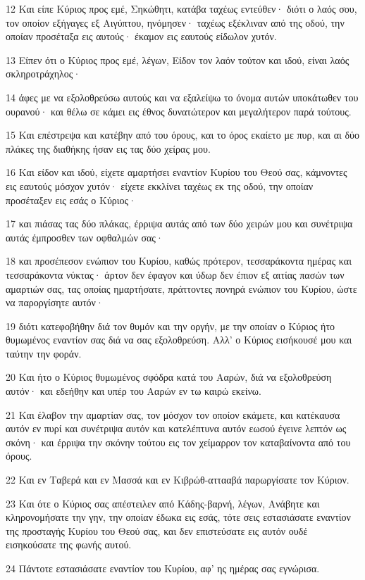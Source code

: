 \par 12 Και είπε Κύριος προς εμέ, Σηκώθητι, κατάβα ταχέως εντεύθεν· διότι ο λαός σου, τον οποίον εξήγαγες εξ Αιγύπτου, ηνόμησεν· ταχέως εξέκλιναν από της οδού, την οποίαν προσέταξα εις αυτούς· έκαμον εις εαυτούς είδωλον χυτόν.
\par 13 Είπεν ότι ο Κύριος προς εμέ, λέγων, Είδον τον λαόν τούτον και ιδού, είναι λαός σκληροτράχηλος·
\par 14 άφες με να εξολοθρεύσω αυτούς και να εξαλείψω το όνομα αυτών υποκάτωθεν του ουρανού· και θέλω σε κάμει εις έθνος δυνατώτερον και μεγαλήτερον παρά τούτους.
\par 15 Και επέστρεψα και κατέβην από του όρους, και το όρος εκαίετο με πυρ, και αι δύο πλάκες της διαθήκης ήσαν εις τας δύο χείρας μου.
\par 16 Και είδον και ιδού, είχετε αμαρτήσει εναντίον Κυρίου του Θεού σας, κάμνοντες εις εαυτούς μόσχον χυτόν· είχετε εκκλίνει ταχέως εκ της οδού, την οποίαν προσέταξεν εις εσάς ο Κύριος·
\par 17 και πιάσας τας δύο πλάκας, έρριψα αυτάς από των δύο χειρών μου και συνέτριψα αυτάς έμπροσθεν των οφθαλμών σας·
\par 18 και προσέπεσον ενώπιον του Κυρίου, καθώς πρότερον, τεσσαράκοντα ημέρας και τεσσαράκοντα νύκτας· άρτον δεν έφαγον και ύδωρ δεν έπιον εξ αιτίας πασών των αμαρτιών σας, τας οποίας ημαρτήσατε, πράττοντες πονηρά ενώπιον του Κυρίου, ώστε να παροργίσητε αυτόν·
\par 19 διότι κατεφοβήθην διά τον θυμόν και την οργήν, με την οποίαν ο Κύριος ήτο θυμωμένος εναντίον σας διά να σας εξολοθρεύση. Αλλ' ο Κύριος εισήκουσέ μου και ταύτην την φοράν.
\par 20 Και ήτο ο Κύριος θυμωμένος σφόδρα κατά του Ααρών, διά να εξολοθρεύση αυτόν· και εδεήθην και υπέρ του Ααρών εν τω καιρώ εκείνω.
\par 21 Και έλαβον την αμαρτίαν σας, τον μόσχον τον οποίον εκάμετε, και κατέκαυσα αυτόν εν πυρί και συνέτριψα αυτόν και κατελέπτυνα αυτόν εωσού έγεινε λεπτόν ως σκόνη· και έρριψα την σκόνην τούτου εις τον χείμαρρον τον καταβαίνοντα από του όρους.
\par 22 Και εν Ταβερά και εν Μασσά και εν Κιβρώθ-αττααβά παρωργίσατε τον Κύριον.
\par 23 Και ότε ο Κύριος σας απέστειλεν από Κάδης-βαρνή, λέγων, Ανάβητε και κληρονομήσατε την γην, την οποίαν έδωκα εις εσάς, τότε σεις εστασιάσατε εναντίον της προσταγής Κυρίου του Θεού σας, και δεν επιστεύσατε εις αυτόν ουδέ εισηκούσατε της φωνής αυτού.
\par 24 Πάντοτε εστασιάσατε εναντίον του Κυρίου, αφ' ης ημέρας σας εγνώρισα.
